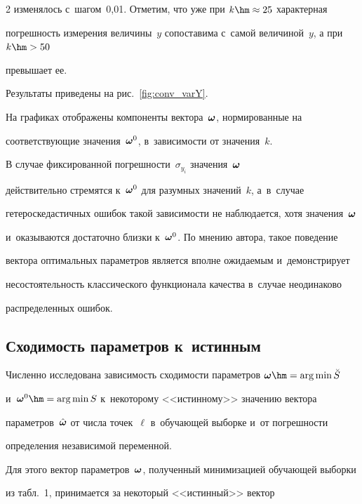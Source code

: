 \begin{multicols}{2}
изменялось с~шагом~0,01. Отметим, что уже при $k \hm\approx 25$ характерная 

погрешность измерения величины~$y$ сопоставима с~самой величиной~$y$, а при $k \hm> 50$ 

превышает ее.



Результаты приведены на рис.~\ref{fig:conv_varY}.

На графиках отображены компоненты вектора~$\boldsymbol{\omega}$, нормированные на

соответствующие значения~$\boldsymbol{\omega}^0$, в~за\-ви\-си\-мости от значения~$k$.







В случае фиксированной погрешности~$\sigma_{y_i}$ значения~$\boldsymbol{\omega}$

действительно стремятся к~$\boldsymbol{\omega}^0$ для разумных значений~$k$, а~в~случае

гетероскедастичных ошибок такой зависимости не наблюдается, хотя значения~$\boldsymbol{\omega}$

и~оказываются достаточно близки к~$\boldsymbol{\omega}^0$. По мнению автора, такое поведение

вектора оптимальных параметров является вполне ожидаемым и~демонстрирует

несостоятельность классического функционала качества в~случае неодинаково

распределенных ошибок.



\subsection{Сходимость параметров к~истинным}



Численно исследована зависимость сходимости параметров $\bomega \hm= \arg \min 

\breve{S}$

и~$\bomega^0 \hm= \arg \min S$ к~некоторому <<истинному>> значению вектора 

па\-ра\-мет\-ров~$\hat{\boldsymbol{\omega}}$ от числа точек~$\ell$ в~обучающей выборке и~от погрешности 

определения независимой переменной.



Для этого вектор параметров~$\boldsymbol{\omega}$, полученный минимизацией обучающей выборки 

из табл.~1, принимается за некоторый <<истинный>> вектор 


\end{multicols}
